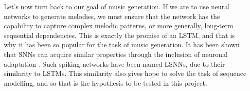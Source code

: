 \documentclass[../../report.tex]{subfiles}
\begin{document}
Let's now turn back to our goal of music generation. If we are to use neural
networks to generate melodies, we must ensure that the network has the
capability to capture complex melodic patterns, or more generally, long-term
sequential dependencies. This is exactly the promise of an LSTM, and that is why
it has been so popular for the task of music generation. It has been shown that
SNNs can acquire similar properties through the inclusion of neuronal adaptation
\cite{Bellec2018LSNN}. Such spiking networks have been named LSNNs, due to their
similarity to LSTMs. This similarity also gives hope to solve the task of
sequence modelling, and so that is the hypothesis to be tested in this project.
\end{document}
